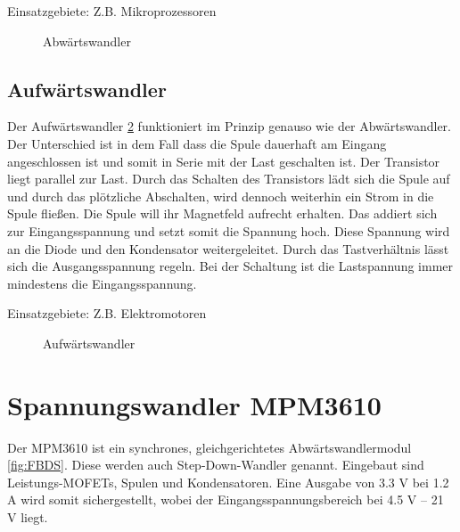 \bigskip

Einsatzgebiete: Z.B. Mikroprozessoren \cite{Ekbert:2014}

\bigskip

\begin{figure}[htbp]
	\centering
	\resizebox{0.8\linewidth}{!}{%
		
	}
	\caption{Abwärtswandler}
	\label{fig:Abwärtswandler}
\end{figure}

\subsection{Aufwärtswandler }

Der Aufwärtswandler \ref{fig:Aufwärtswandler} funktioniert im Prinzip genauso wie der Abwärtswandler. Der Unterschied ist in dem Fall dass die Spule dauerhaft am Eingang angeschlossen ist und somit in Serie mit der Last geschalten ist. Der Transistor liegt parallel zur Last. Durch das Schalten des Transistors lädt sich die Spule auf und durch das plötzliche Abschalten, wird dennoch weiterhin ein Strom in die Spule fließen. Die Spule will ihr Magnetfeld aufrecht erhalten. Das addiert sich zur Eingangsspannung und setzt somit die Spannung hoch. Diese Spannung wird an die Diode und den Kondensator weitergeleitet. Durch das Tastverhältnis lässt sich die Ausgangsspannung regeln. Bei der Schaltung ist die Lastspannung immer mindestens die Eingangsspannung. 

\bigskip

Einsatzgebiete: Z.B. Elektromotoren  \cite{Ekbert:2014}

\bigskip

\begin{figure}[htbp]
	\centering
	\resizebox{0.8\linewidth}{!}{%
		
	}
	\caption{Aufwärtswandler}
	\label{fig:Aufwärtswandler}
\end{figure}

\section{Spannungswandler MPM3610}

Der MPM3610 ist ein synchrones, gleichgerichtetes Abwärtswandlermodul \ref{fig:FBDS}. Diese werden auch Step-Down-Wandler genannt. Eingebaut sind Leistungs-MOFETs, Spulen und Kondensatoren. Eine Ausgabe von 3.3 V bei 1.2 A wird somit sichergestellt, wobei der Eingangsspannungsbereich bei 4.5 V – 21 V liegt. \cite{MPS:2015}

